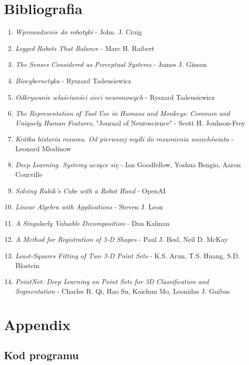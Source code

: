 \documentclass{article}
\begin{document}
\section*{\LARGE{Bibliografia}}
\begin{enumerate}
\item \emph{Wprowadzenie do robotyki} - John. J. Craig
\item \emph{Legged Robots That Balance} - Marc H. Raibert
\item \emph{The Senses Considered as Perceptual Systems} - James J. Ginson
\item \emph{Biocybernetyka} - Ryszard Tadeusiewicz
\item \emph{Odkrywanie właściwości sieci neuronowych} - Ryszard Tadeusiewicz
\item \emph{The Representation of Tool Use in Humans and Monkeys: Common and Uniquely Human Features}, "Journal of Neuroscience" - Scott H. Jonhson-Frey
\item \emph{Krótka historia rozumu. Od pierwszej myśli do rozumienia wszechświata} - Leonard Mlodinow
\item \emph{Deep Learning. Systemy uczące się} - Ian Goodfellow, Yoshua Bengio, Aaron Courville
\item \emph{Solving Rubik's Cube with a Robot Hand} - OpenAI
\item \emph{Linear Algebra with Applications} - Steven J. Leon
\item \emph{A Singularly Valuable Decomposition} - Dan Kalman
\item \emph{A Method for Registration of 3-D Shapes} - Paul J. Besl, Neil D. McKay
\item \emph{Least-Squares Fitting of Two 3-D Point Sets} - K.S. Arun, T.S. Huang, S.D. Blostein
\item \emph{PointNet: Deep Learning on Point Sets for 3D Classification and Segmentation} - Charles R. Qi, Hao Su, Kaichun Mo, Leonidas J. Guibas
\end{enumerate}

\newpage
\section*{\LARGE{Appendix}}
\subsection*{\Large{Kod programu}}

\end{document}
